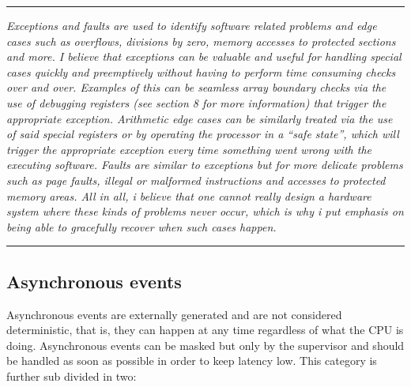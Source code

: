     \par\noindent\rule{\textwidth}{0.4pt}
    \textit{Exceptions and faults are used to identify software related problems and edge cases such as overflows, divisions by zero, memory accesses to protected sections and more. I believe that exceptions can be valuable and useful for handling special cases quickly and preemptively without having to perform time consuming checks over and over. Examples of this can be seamless array boundary checks via the use of debugging registers (see section 8 for more information) that trigger the appropriate exception. Arithmetic edge cases can be similarly treated via the use of said special registers or by operating the processor in a ``safe state'', which will trigger the appropriate exception every time something went wrong with the executing software. Faults are similar to exceptions but for more delicate problems such as page faults, illegal or malformed instructions and accesses to protected memory areas. All in all, i believe that one cannot really design a hardware system where these kinds of problems never occur, which is why i put emphasis on being able to gracefully recover when such cases happen.}
    \par\noindent\rule{\textwidth}{0.4pt}

    \subsection{Asynchronous events}

        \vspace{10pt}

        Asynchronous events are externally generated and are not considered deterministic, that is, they can happen at any time regardless of what the CPU is doing. Asynchronous events can be masked but only by the supervisor and should be handled as soon as possible in order to keep latency low. This category is further sub divided in two:

